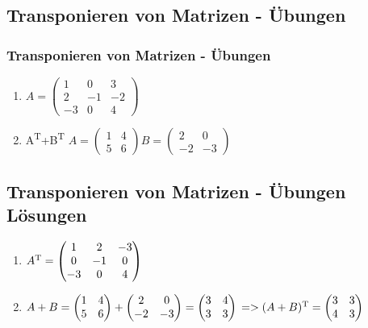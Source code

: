 \subsection{Transponieren von Matrizen - Übungen}
\begin{frame}
\frametitle{Transponieren von Matrizen - Übungen}
\begin{enumerate}
\item $A = \begin{pmatrix}
1 & 0 & 3\\
2 & -1 & -2\\
-3 & 0 & 4
\end{pmatrix}$
\item A\textsuperscript{T}+B\textsuperscript{T}
$A = \begin{pmatrix}
1 & 4 \\
5 & 6
\end{pmatrix}
B = \begin{pmatrix}
2 & 0\\
-2 & -3
\end{pmatrix}$
\end{enumerate}
\end{frame}


\subsection{Transponieren von Matrizen - Übungen Lösungen}
\begin{frame}
\begin{enumerate}
\item $A\textsuperscript{T} = \begin{pmatrix}
1 & 2 & -3\\
0 & -1 & 0\\
-3 & 0 & 4
\end{pmatrix}$
\item $A + B = \begin{pmatrix}
1 & 4\\
5 & 6
\end{pmatrix} + \begin{pmatrix}
2 & 0\\
-2 & -3
\end{pmatrix} = \begin{pmatrix}
3 & 4\\
3 & 3
\end{pmatrix} 
\newline
=> (A+B)\textsuperscript{T} = \begin{pmatrix}
3 & 3\\
4 & 3
\end{pmatrix}$
\end{enumerate}
\end{frame}

